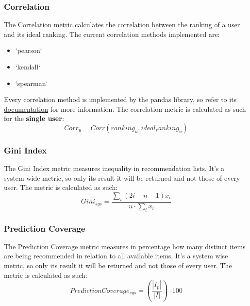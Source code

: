 \documentclass[11pt]{article}
\begin{document}
\subsubsection{Correlation}\label{subsubsec:corr}
The Correlation metric calculates the correlation between the ranking of a user and its ideal ranking.
The current correlation methods implemented are:
\begin{itemize}
    \item `pearson`
    \item `kendall`
    \item `spearman`
\end{itemize}
\hfill\break
\hfill\break
Every correlation method is implemented by the pandas library, so refer to its
\href{https://pandas.pydata.org/docs/reference/api/pandas.Series.corr.html}{documentation} for more information.
\hfill\break
\hfill\break
The correlation metric is calculated as such for the \textbf{single user}:
\hfill\break
\hfill\break
    \[
        Corr_u = Corr(ranking_u, ideal_ranking_u)
    \]
\hfill\break


\subsubsection{Gini Index}\label{subsubsec:gini}
The Gini Index metric measures inequality in recommendation lists.
It's a system-wide metric, so only its result it will be returned and not those of every user.
The metric is calculated as such:
\hfill\break
\hfill\break
    \[
        Gini_{sys} = \frac{\sum_i(2i - n - 1)x_i}{n\cdot\sum_i x_i}
    \]
\hfill\break


\subsubsection{Prediction Coverage}\label{subsubsec:pred_cov}
The Prediction Coverage metric measures in percentage how many distinct items are being recommended in relation
to all available items.
It's a system wise metric, so only its result it will be returned and not those of every user.
The metric is calculated as such:
\hfill\break
\hfill\break
    \[
         Prediction Coverage_{sys} = (\frac{|I_p|}{|I|})\cdot100
    \]
\hfill\break
\end{document}
